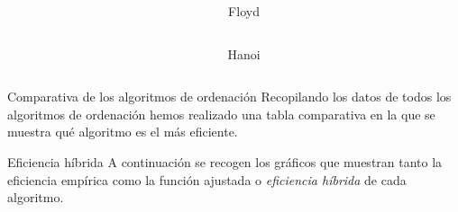 \documentclass[spanish]{beamer}
\begin{document}
\begin{frame}
	\begin{center}
		
	\end{center}
\end{frame}

\begin{frame}
	\begin{columns}[c] %
		\begin{column}{.6\textwidth}
		\end{column}%
		
		\hfill%
		
		\begin{column}{.3\textwidth}
			Floyd
		\end{column}%
		
	\end{columns}
\end{frame}

\begin{frame}
	\begin{columns}[c] %
		\begin{column}{.6\textwidth}
		\end{column}%
		
		\hfill%
		
		\begin{column}{.3\textwidth}
			Hanoi
		\end{column}%
		
	\end{columns}
\end{frame}

\begin{frame}{Comparativa de los algoritmos de ordenación}
	Recopilando los datos de todos los algoritmos de ordenación hemos realizado una tabla comparativa en la que se muestra qué algoritmo es el más eficiente.
\end{frame}

\begin{frame}
	\begin{center}
		
	\end{center}
\end{frame}

\begin{frame}{Eficiencia híbrida}
	A continuación se recogen los gráficos que muestran tanto la eficiencia empírica como la función ajustada o \textit{eficiencia híbrida} de cada algoritmo.	
\end{frame}
\end{document}
